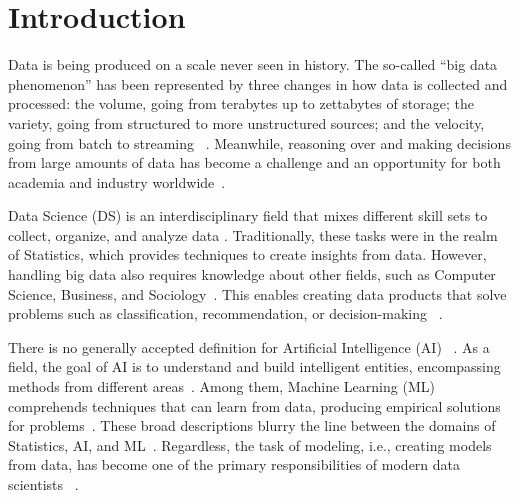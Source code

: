 
\chapter{Introduction}
\label{chap:introduction}

Data is being produced on a scale never seen in history. The so-called
``big data phenomenon'' has been represented by three changes in how
data is collected and processed:
  the volume, going from terabytes up to zettabytes of storage;
  the variety, going from structured to more unstructured sources; and
  the velocity, going from batch to streaming%
~\parencite{Sagiroglu2013BigReview}.
Meanwhile, reasoning over and making decisions from large amounts of data
has become a challenge and an opportunity for both academia and industry
worldwide~\parencite{Lu2020ArtificialInnovation}.

Data Science (DS) is an interdisciplinary field that mixes different skill
sets to collect, organize, and analyze data \parencite{Hayashi1998WhatExample}.
Traditionally, these tasks were in the realm of Statistics, which provides
techniques to create insights from data. However, handling big data also
requires knowledge about other fields, such as Computer Science, Business,
and Sociology~\parencite{Cao2018DataScience,Dhar2013DataPrediction}.
This enables creating data products that solve problems such as
classification, recommendation, or decision-making%
~\parencite{Cao2018DataScience,Lakshmanan2020MachinePatterns}.

There is no generally accepted definition for Artificial Intelligence (AI)%
~\parencite{Emmert-Streib2020ArtificialStatus}. As a field, the goal of AI
is to understand and build intelligent entities, encompassing methods
from different areas~\parencite{RussellS2021Artificial4th}. Among them,
Machine Learning (ML) comprehends techniques that can learn from data,
producing empirical solutions for problems~\parencite{Abu-Mostafa2012LearningData}.
These broad descriptions blurry the line between the domains of Statistics,
AI, and ML~\parencite{Emmert-Streib2020ArtificialStatus}. Regardless,
the task of modeling, i.e., creating models from data, has become
one of the primary responsibilities of modern data scientists%
~\mbox{\parencite{Burkov2020MachineEngineering,Kim2016TheTeams,
Lakshmanan2020MachinePatterns}}.

